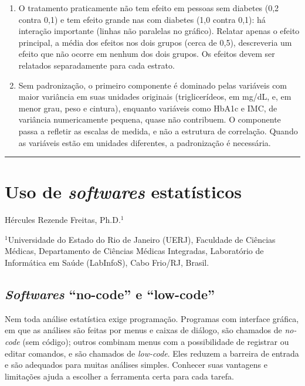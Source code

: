 \documentclass[
]{book}
\begin{document}
\begin{enumerate}
\item
  O tratamento praticamente não tem efeito em pessoas sem diabetes (0,2 contra 0,1) e tem efeito grande nas com diabetes (1,0 contra 0,1): há interação importante (linhas não paralelas no gráfico). Relatar apenas o efeito principal, a média dos efeitos nos dois grupos (cerca de 0,5), descreveria um efeito que não ocorre em nenhum dos dois grupos. Os efeitos devem ser relatados separadamente para cada estrato.
\item
  Sem padronização, o primeiro componente é dominado pelas variáveis com maior variância em suas unidades originais (triglicerídeos, em mg/dL, e, em menor grau, peso e cintura), enquanto variáveis como HbA1c e IMC, de variância numericamente pequena, quase não contribuem. O componente passa a refletir as escalas de medida, e não a estrutura de correlação. Quando as variáveis estão em unidades diferentes, a padronização é necessária.
\end{enumerate}

\begin{center}\rule{0.5\linewidth}{0.5pt}\end{center}

\chapter{\texorpdfstring{Uso de \emph{softwares} estatísticos}{Uso de softwares estatísticos}}\label{uso-de-softwares-estatuxedsticos}

Hércules Rezende Freitas, Ph.D.\(^1\)

\(^1\)Universidade do Estado do Rio de Janeiro (UERJ), Faculdade de Ciências Médicas, Departamento de Ciências Médicas Integradas, Laboratório de Informática em Saúde (LabInfoS), Cabo Frio/RJ, Brasil.

\section{\texorpdfstring{\emph{Softwares} ``no-code'' e ``low-code''}{Softwares ``no-code'' e ``low-code''}}\label{softwares-no-code-e-low-code}

Nem toda análise estatística exige programação. Programas com interface gráfica, em que as análises são feitas por menus e caixas de diálogo, são chamados de \emph{no-code} (sem código); outros combinam menus com a possibilidade de registrar ou editar comandos, e são chamados de \emph{low-code}. Eles reduzem a barreira de entrada e são adequados para muitas análises simples. Conhecer suas vantagens e limitações ajuda a escolher a ferramenta certa para cada tarefa.
\end{document}
